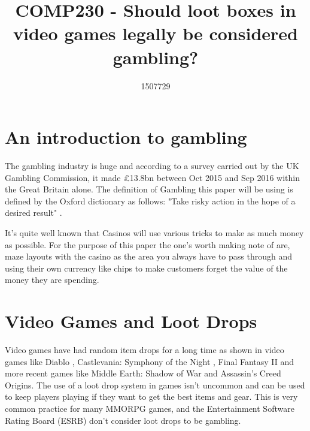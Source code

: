 \documentclass{scrartcl}
\title{COMP230 - Should loot boxes in video games legally be considered gambling?}
\author{1507729}
\begin{document}
\maketitle


\section{An introduction to gambling}
The gambling industry is huge and according to a survey carried out by the UK Gambling Commission, it made £13.8bn between Oct 2015 and Sep 2016 within the Great Britain alone. \cite{GamCom2017Stats} The definition of Gambling this paper will be using is defined by the Oxford dictionary as follows: "Take risky action in the hope of a desired result" \cite{Oxford2017Gamble}. 

It's quite well known that Casinos will use various tricks to make as much money as possible. \cite{Casino2014design, Libby2014Tricks} For the purpose of this paper the one's worth making note of are, maze layouts with the casino as the area you always have to pass through and using their own currency like chips to make customers forget the value of the money they are spending.

\section{Video Games and Loot Drops}
Video games have had random item drops for a long time as shown in video games like Diablo \cite{Blizzard1996Diablo}, Castlevania: Symphony of the Night \cite{Konami1997Castlevania}, Final Fantasy II \cite{Square1988Final}and more recent games like Middle Earth: Shadow of War \cite{Monolith2017Middle} and Assassin's Creed Origins. \cite{Ubisoft2017Assassin} The use of a loot drop system in games isn't uncommon and can be used to keep players playing if they want to get the best items and gear. This is very common practice for many MMORPG games, and the Entertainment Software Rating Board (ESRB) don't consider loot drops to be gambling.
\end{document}

